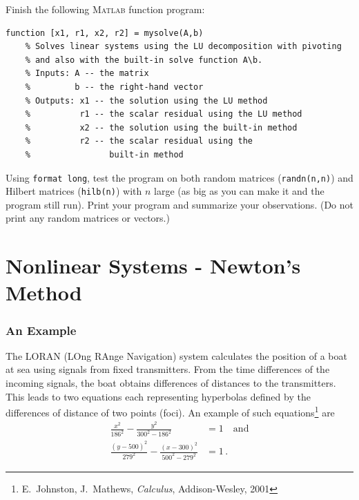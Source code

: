 \begin{list}
\item
Finish the following \textsc{Matlab} function program:
\begin{lstlisting}
function [x1, r1, x2, r2] = mysolve(A,b)
    % Solves linear systems using the LU decomposition with pivoting
    % and also with the built-in solve function A\b.
    % Inputs: A -- the matrix
    %         b -- the right-hand vector
    % Outputs: x1 -- the solution using the LU method
    %          r1 -- the scalar residual using the LU method
    %          x2 -- the solution using the built-in method
    %          r2 -- the scalar residual using the 
    %                built-in method
\end{lstlisting}

Using \verb&format long&, test the program on both random matrices
(\verb&randn(n,n)&) and Hilbert matrices (\verb&hilb(n)&) with $n$
large (as big as you can make it and the program still run). Print
your program and summarize your observations.  (Do not print any
random matrices or vectors.)
\end{list}



\chapter{Nonlinear Systems - Newton's Method}
\label{lec:multnewton}


\subsection*{An Example}

The LORAN (LOng RAnge Navigation) system calculates the position
of a boat at sea using signals from fixed transmitters. From
the time differences of the incoming signals, the boat obtains
differences of distances to the transmitters. This leads
to two equations each representing hyperbolas defined
by the differences of distance of two points (foci). An example
of such equations\footnote{E.~Johnston, J.~Mathews, {\em Calculus}, Addison-Wesley, 2001} are
\begin{equation}\label{eqn:loran}
\begin{split}
   \frac{x^2}{186^2} - \frac{y^2}{300^2 - 186^2} &= 1
\quad\text{and}\\
  \frac{(y-500)^2}{279^2} - \frac{(x-300)^2}{500^2 - 279^2} &= 1
\,.
\end{split}
\end{equation}


